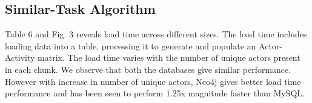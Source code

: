 \documentclass[11pt]{article}
\makeatletter
\newcommand{\specialcell}[2][c]{%
  \begin{tabular}[#1]{@{}c@{}}#2\end{tabular}}
\makeatother
\begin{document}
{{\subsection{Similar-Task Algorithm}
\par{Table 6 and Fig. 3 reveals load time across different sizes. The load time includes loading data into a table, processing it to generate and populate an Actor-Activity matrix. The load time varies with the number of unique actors present in each chunk. We observe that both the databases give similar performance. However with increase in number of unique actors, Neo4j gives better load time performance and has been seen to perform 1.25x magnitude faster than MySQL.}
\renewcommand{\arraystretch}{.5}
\begin{table}
\CenterFloatBoxes
{}
\end{table}

}}
\end{document}
